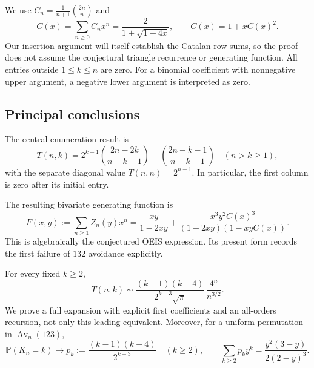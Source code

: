 \documentclass[11pt]{article}
\numberwithin{equation}{section}
\theoremstyle{definition}
\newcommand{\Av}{\operatorname{Av}}
\newcommand{\Prob}{\mathbb P}
\begin{document}
We use $C_n=\frac1{n+1}\binom{2n}{n}$ and
\begin{equation}\label{fpf:eq:catalan}
 C(x)=\sum_{n\ge0}C_nx^n=\frac{2}{1+\sqrt{1-4x}},
 \qquad C(x)=1+xC(x)^2.
\end{equation}
Our insertion argument will itself establish the Catalan row sums, so the
proof does not assume the conjectural triangle recurrence or generating
function. All entries outside $1\le k\le n$ are zero. For a binomial
coefficient with nonnegative upper argument, a negative lower argument is
interpreted as zero.

\subsection{Principal conclusions}
The central enumeration result is
\begin{equation}\label{fpf:eq:main-binomial}
\boxed{\displaystyle
 T(n,k)=2^{k-1}\binom{2n-2k}{n-k-1}
             -\binom{2n-k-1}{n-k-1}\quad (n>k\ge1),}
\end{equation}
with the separate diagonal value $T(n,n)=2^{n-1}$. In particular, the first
column is zero after its initial entry.

The resulting bivariate generating function is
\begin{equation}\label{fpf:eq:main-gf}
\boxed{\displaystyle
 F(x,y):=\sum_{n\ge1}Z_n(y)x^n
 =\frac{xy}{1-2xy}
  +\frac{x^3y^2C(x)^3}{(1-2xy)(1-xyC(x))}.}
\end{equation}
This is algebraically the conjectured OEIS expression. Its present form
records the first failure of $132$ avoidance explicitly.

For every fixed $k\ge2$,
\begin{equation}\label{fpf:eq:main-asymptotic}
 T(n,k)\sim \frac{(k-1)(k+4)}{2^{k+3}\sqrt\pi}\,
                 \frac{4^n}{n^{3/2}}.
\end{equation}
We prove a full expansion with explicit first coefficients and an all-orders
recursion, not only this leading equivalent. Moreover, for a uniform
permutation in $\Av_n(123)$,
\begin{equation}\label{fpf:eq:main-discrete-law}
 \Prob(K_n=k)\longrightarrow p_k:=\frac{(k-1)(k+4)}{2^{k+3}}
 \quad(k\ge2),\qquad
 \sum_{k\ge2}p_ky^k=\frac{y^2(3-y)}{2(2-y)^3}.
\end{equation}
\end{document}
